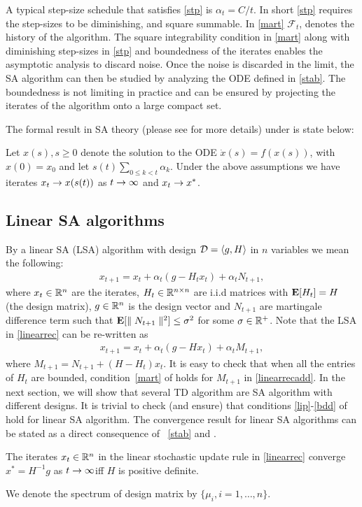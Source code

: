A typical step-size schedule that satisfies \ref{stp} is $\alpha_t=C/t$. In short \ref{stp} requires the step-sizes to be diminishing, and square summable. In \ref{mart} $\mathcal{F}_t$, denotes the history of the algorithm. The square integrability condition in \ref{mart} along with diminishing step-sizes in \ref{stp} and boundedness of the iterates enables the asymptotic analysis to discard noise. Once the noise is discarded in the limit, the SA algorithm can then be studied by analyzing the ODE defined in \ref{stab}. The boundedness is not limiting in practice and can be ensured by projecting the iterates of the algorithm onto a large compact set.\par
The formal result in SA theory (please see \cite{SA} for more details) under  is state below:
\begin{theorem}\label{sat}
Let $x(s),s\geq 0$ denote the solution to the ODE $\dot{x}(s)=f(x(s))$, with $x(0)=x_0$ and let $s(t)\sum_{0\leq k< t}\alpha_k$. Under the above assumptions we have iterates $x_t\rightarrow x(s(t))$ as $t\rightarrow\infty$ and $x_t\rightarrow x^*$.
\end{theorem}
\subsection{Linear SA algorithms}
By a linear SA (LSA) algorithm with design $\mathcal{D}=\langle g,H\rangle$ in $n$ variables we mean the following:
\begin{align}\label{linearrec}
x_{t+1}=x_t+\alpha_t(g-H_t x_t)+\alpha_t N_{t+1},
\end{align}
where $x_t\in \mathbb{R}^n$ are the iterates, $H_t\in \mathbb{R}^{n\times n}$ are i.i.d matrices with $\mathbf{E}[H_t]=H$ (the design matrix), $g\in \mathbb{R}^n$ is the design vector and $N_{t+1}$ are martingale difference term such that $\mathbf{E}[\parallel N_{t+1} \parallel^2]\leq \sigma^2$ for some $\sigma\in \mathbb{R}^+$. Note that the LSA in \eqref{linearrec} can be re-written as 
\begin{align}\label{linearrecadd}
x_{t+1}=x_t+\alpha_t(g-H x_t)+\alpha_t M_{t+1},
\end{align}
where $M_{t+1}=N_{t+1}+(H-H_t)x_t$. It is easy to check that when all the entries of $H_t$ are bounded, condition~\ref{mart} of  holds for $M_{t+1}$ in \eqref{linearrecadd}.
In the next section, we will show that several TD algorithm are SA algorithm with different designs. 
It is trivial to check (and ensure) that conditions \ref{lip}-\ref{bdd} of  hold for linear SA algorithm. The convergence result for linear SA algorithms can be stated as 
a direct consequence of ~\ref{stab} and .
\begin{corollary}\label{linstab}
The iterates $x_t\in \mathbb{R}^n$ in the linear stochastic update rule in \eqref{linearrec} converge $x^*=H^{-1}g$ as $t\rightarrow\infty $iff $H$ is positive definite.
\end{corollary}
We denote the spectrum of design matrix by $\{\mu_i,i=1,\ldots,n\}$.
